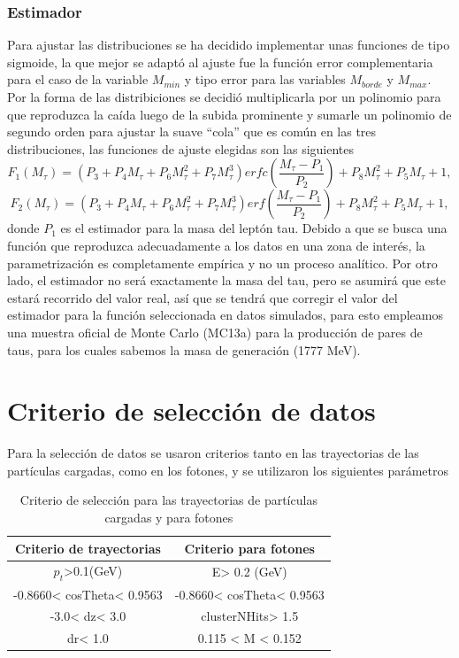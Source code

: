\subsubsection{Estimador} 
Para ajustar las distribuciones se ha decidido implementar unas funciones de tipo sigmoide, la que mejor se adaptó al ajuste fue la función error complementaria para el caso de la variable \(M_{min}\) y tipo error para las variables \(M_{borde}\) y \(M_{max}\). Por la forma de las distribiciones se decidió multiplicarla por un polinomio para que reproduzca la caída luego de la subida prominente y sumarle un polinomio de segundo orden para ajustar la suave ``cola'' que es común en las tres distribuciones, las funciones de ajuste elegidas son las siguientes
\begin{equation}
    F_1(M_{\tau})=(P_3+P_4M_{\tau}+P_6M_{\tau}^2+P_7M_{\tau}^3)erfc\left(\frac{M_{\tau}-P_1}{P_2}\right)+P_8M_{\tau}^2+P_5M_{\tau}+1, \label{52}
\end{equation}
\begin{equation}
    F_2(M_{\tau})=(P_3+P_4M_{\tau}+P_6M_{\tau}^2+P_7M_{\tau}^3)erf\left(\frac{M_{\tau}-P_1}{P_2}\right)+P_8M_{\tau}^2+P_5M_{\tau}+1, \label{53}
\end{equation}
donde \(P_1\) es el estimador para la masa del leptón tau. Debido a que se busca una función que reproduzca adecuadamente a los datos en una zona de interés, la parametrización es completamente empírica y no un proceso analítico. Por otro lado, el estimador no será exactamente la masa del tau, pero se asumirá que este estará recorrido del valor real, así que se tendrá que corregir el valor del estimador para la función seleccionada en datos simulados, para esto empleamos una muestra oficial de Monte Carlo (MC13a) para la producción de pares de taus, para los cuales sabemos la masa de generación (1777 MeV).

\section{Criterio de selección de datos}
Para la selección de datos se usaron criterios tanto en las trayectorias de las partículas cargadas, como en los fotones, y se utilizaron los siguientes parámetros
\begin{table}[h!]
\centering
 \begin{tabular}{||c | c||} 
 \hline
 Criterio de trayectorias & Criterio para fotones  \\ [0.5ex] 
 \hline\hline
 \(p_t\)>0.1(GeV) & E> 0.2 (GeV)\\ 
 \hline
 -0.8660< cosTheta< 0.9563 & -0.8660< cosTheta< 0.9563  \\
 \hline
 -3.0< dz< 3.0 & clusterNHits> 1.5  \\
 \hline
 dr< 1.0 & 0.115 < M < 0.152  \\
 \hline
 \end{tabular}
 \caption{\small{Criterio de selección para las trayectorias de partículas cargadas y para fotones}}\label{table:crite}
\end{table}

